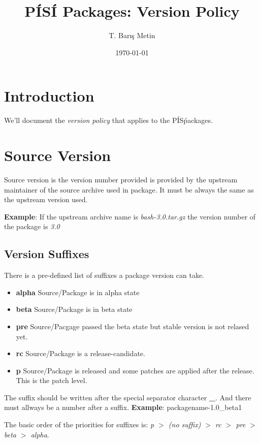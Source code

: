\documentclass[a4paper,11pt]{article}
\title{P\'IS\'I Packages: Version Policy}
\date{\today}
\author{T. Bar\i{}\c s Metin}
\begin{document}
\maketitle

\section{Introduction}

We'll document the \emph{version policy} that applies to the P\'IS\'
packages.

\section{Source Version}

Source version is the version number provided is provided by the
upstream maintainer of the source archive used in package. It must be
always the same as the upstream version used.

\textbf{Example}: If the upstream archive name is
\emph{bash-3.0.tar.gz} the version number of the package is \emph{3.0}

\subsection{Version Suffixes}

There is a pre-defined list of suffixes a package version can
take.

\begin{itemize}
  \item \textbf{alpha} Source/Package is in alpha state
  \item \textbf{beta} Source/Package is in beta state
  \item \textbf{pre} Source/Pacgage passed the beta state but stable
    version is not relased yet.
  \item \textbf{rc} Source/Package is a release-candidate.
  \item \textbf{p} Source/Package is released and some patches are
    applied after the release. This is the patch level.
\end{itemize}

The suffix should be written after the special separator
character \textbf{\_}. And there must allways be a number after a
suffix. \textbf{Example}: packagename-1.0\_beta1

The basic order of the priorities for suffixes is:\newline
\emph{p $>$ (no suffix) $>$ rc $>$ pre $>$ beta $>$ alpha}.
\end{document}
